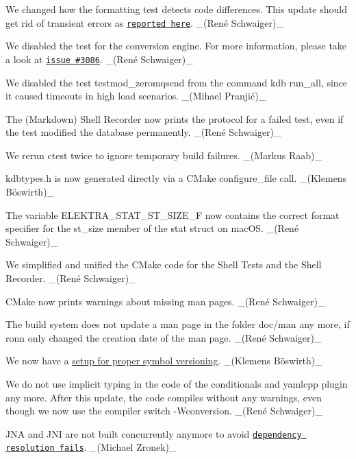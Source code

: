 \begin{DoxyItemize}
\item We changed how the {\ttfamily formatting test} detects code differences. This update should get rid of transient errors as \href{https://issues.libelektra.org/2927#issuecomment-528058641}{\tt reported here}. \+\_\+(René Schwaiger)\+\_\+
\item We disabled the test for the conversion engine. For more information, please take a look at \href{https://issues.libelektra.org/3086}{\tt issue \#3086}. \+\_\+(René Schwaiger)\+\_\+
\item We disabled the test {\ttfamily testmod\+\_\+zeromqsend} from the command {\ttfamily kdb run\+\_\+all}, since it caused timeouts in high load scenarios. \+\_\+(Mihael Pranjić)\+\_\+
\item The (Markdown) Shell Recorder now prints the protocol for a failed test, even if the test modified the database permanently. \+\_\+(René Schwaiger)\+\_\+
\item We rerun ctest twice to ignore temporary build failures. \+\_\+(\+Markus Raab)\+\_\+
\end{DoxyItemize}


\begin{DoxyItemize}
\item {\ttfamily kdbtypes.\+h} is now generated directly via a C\+Make {\ttfamily configure\+\_\+file} call. \+\_\+(Klemens Böswirth)\+\_\+
\item The variable {\ttfamily E\+L\+E\+K\+T\+R\+A\+\_\+\+S\+T\+A\+T\+\_\+\+S\+T\+\_\+\+S\+I\+Z\+E\+\_\+F} now contains the correct format specifier for the {\ttfamily st\+\_\+size} member of the {\ttfamily stat} struct on mac\+OS. \+\_\+(René Schwaiger)\+\_\+
\item We simplified and unified the C\+Make code for the Shell Tests and the Shell Recorder. \+\_\+(René Schwaiger)\+\_\+
\item C\+Make now prints warnings about missing man pages. \+\_\+(René Schwaiger)\+\_\+
\item The build system does not update a man page in the folder doc/man any more, if ronn only changed the creation date of the man page. \+\_\+(René Schwaiger)\+\_\+
\end{DoxyItemize}


\begin{DoxyItemize}
\item We now have a \hyperlink{doc_dev_symbol-versioning_md}{setup for proper symbol versioning}. \+\_\+(Klemens Böswirth)\+\_\+
\item We do not use implicit typing in the code of the {\ttfamily conditionals} and {\ttfamily yamlcpp} plugin any more. After this update, the code compiles without any warnings, even though we now use the compiler switch {\ttfamily -\/\+Wconversion}. \+\_\+(René Schwaiger)\+\_\+
\item J\+NA and J\+NI are not built concurrently anymore to avoid \href{https://jira.apache.org/jira/browse/MDEP-518}{\tt dependency resolution fails}. \+\_\+(\+Michael Zronek)\+\_\+
\end{DoxyItemize}


